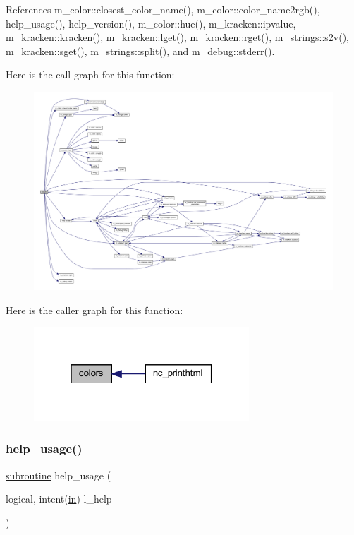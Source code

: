 References m\+\_\+color\+::closest\+\_\+color\+\_\+name(), m\+\_\+color\+::color\+\_\+name2rgb(), help\+\_\+usage(), help\+\_\+version(), m\+\_\+color\+::hue(), m\+\_\+kracken\+::ipvalue, m\+\_\+kracken\+::kracken(), m\+\_\+kracken\+::lget(), m\+\_\+kracken\+::rget(), m\+\_\+strings\+::s2v(), m\+\_\+kracken\+::sget(), m\+\_\+strings\+::split(), and m\+\_\+debug\+::stderr().

Here is the call graph for this function\+:
\nopagebreak
\begin{figure}[H]
\begin{center}
\leavevmode
\includegraphics[width=350pt]{colors_8f90_a147ff2bc384cd71c5234499e7a85bada_cgraph}
\end{center}
\end{figure}
Here is the caller graph for this function\+:
\nopagebreak
\begin{figure}[H]
\begin{center}
\leavevmode
\includegraphics[width=229pt]{colors_8f90_a147ff2bc384cd71c5234499e7a85bada_icgraph}
\end{center}
\end{figure}
\mbox{\label{colors_8f90_a3e09a3b52ee8fb04eeb93fe5761626a8}} 
\subsubsection{\texorpdfstring{help\+\_\+usage()}{help\_usage()}}
{\footnotesize\ttfamily \hyperlink{M__stopwatch_83_8txt_acfbcff50169d691ff02d4a123ed70482}{subroutine} help\+\_\+usage (\begin{DoxyParamCaption}\item[{logical, intent(\hyperlink{M__journal_83_8txt_afce72651d1eed785a2132bee863b2f38}{in})}]{l\+\_\+help }\end{DoxyParamCaption})}




